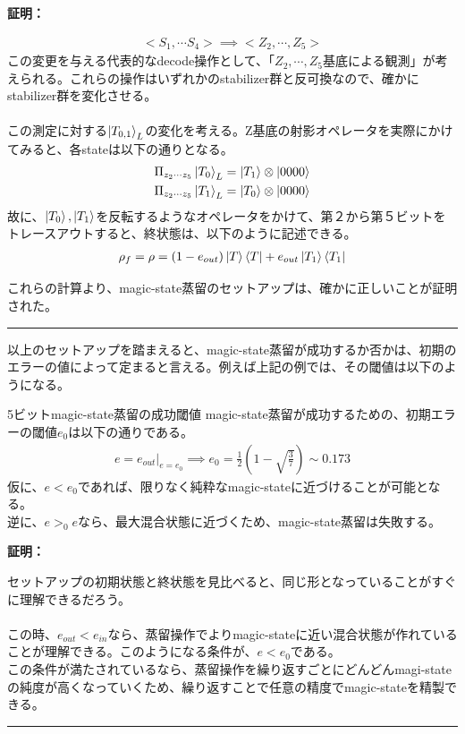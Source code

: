 \documentclass[a4paper,10.5pt]{article}
\numberwithin{equation}{section}
\newenvironment{proofbox}
{\begin{prooflabel}\textbf{証明：}\end{prooflabel}\vspace{0.8em}}
{\par\vspace{1em}\hrule\vspace{1em}}
\begin{document}
\begin{proofbox}
\begin{enumerate}
\begin{align*}
        <S_{1},\cdots S_{4}>\implies<Z_{2},\cdots, Z_{5}>
    \end{align*}
    この変更を与える代表的なdecode操作として、「$Z_{2},\cdots, Z_{5}$基底による観測」が考えられる。これらの操作はいずれかのstabilizer群と反可換なので、確かにstabilizer群を変化させる。\\
    \\
    この測定に対する$\ket{T_{0,1}}_{L}$の変化を考える。Z基底の射影オペレータを実際にかけてみると、各stateは以下の通りとなる。
    \begin{align*}
        &\Pi_{z_{2}\cdots z_{5}}\ket{T_{0}}_{L}=\ket{T_{1}}\otimes \ket{0000}\\
        &\Pi_{z_{2}\cdots z_{5}}\ket{T_{1}}_{L}=\ket{T_{0}}\otimes \ket{0000}
    \end{align*}
    故に、$\ket{T_{0}},\ket{T_{1}}$を反転するようなオペレータをかけて、第２から第５ビットをトレースアウトすると、終状態は、以下のように記述できる。
        \begin{align*}
            \rho_{f}=\rho=(1-e_{out})\ket{T}\bra{T}+e_{out}\ket{T_{1}}\bra{T_{1}}
        \end{align*}
\end{enumerate}
これらの計算より、magic-state蒸留のセットアップは、確かに正しいことが証明された。
\end{proofbox}
以上のセットアップを踏まえると、magic-state蒸留が成功するか否かは、初期のエラーの値によって定まると言える。例えば上記の例では、その閾値は以下のようになる。
\begin{resultbox}{5ビットmagic-state蒸留の成功閾値}
        magic-state蒸留が成功するための、初期エラーの閾値$e_{0}$は以下の通りである。
        \begin{align*}
            e=e_{out}|_{e=e_{0}}\implies e_{0}=\frac{1}{2}(1-\sqrt{\frac{3}{7}})\sim 0.173
        \end{align*}
        仮に、$e<e_{0}$であれば、限りなく純粋なmagic-stateに近づけることが可能となる。\\
        逆に、$e>_{0}e$なら、最大混合状態に近づくため、magic-state蒸留は失敗する。
\end{resultbox}
\begin{proofbox}
    セットアップの初期状態と終状態を見比べると、同じ形となっていることがすぐに理解できるだろう。\\
    \\
    この時、$e_{out}<e_{in}$なら、蒸留操作でよりmagic-stateに近い混合状態が作れていることが理解できる。このようになる条件が、$e<e_{0}$である。\\
    この条件が満たされているなら、蒸留操作を繰り返すごとにどんどんmagi-stateの純度が高くなっていくため、繰り返すことで任意の精度でmagic-stateを精製できる。
\end{proofbox}
\end{document}
